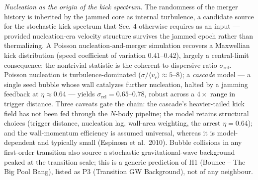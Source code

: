 \documentclass[
  11pt,
]{article}
\begin{document}
\emph{Nucleation as the origin of the kick spectrum.} The randomness of
the merger history is inherited by the jammed core as internal
turbulence, a candidate source for the stochastic kick spectrum that
Sec. 4 otherwise requires as an input --- provided nucleation-era
velocity structure survives the jammed epoch rather than thermalizing. A
Poisson nucleation-and-merger simulation recovers a Maxwellian kick
distribution (speed coefficient of variation \(0.41\)--\(0.42\)),
largely a central-limit consequence; the nontrivial statistic is the
coherent-to-dispersive ratio \(\sigma_{\text{rel}}\). Poisson nucleation
is turbulence-dominated
(\(\sigma/\langle v_r\rangle \approx 5\)--\(8\)); a \emph{cascade} model
--- a single seed bubble whose wall catalyzes further nucleation, halted
by a jamming feedback at \(\eta \approx 0.64\) --- yields
\(\sigma_{\text{rel}} = 0.65\)--\(0.78\), robust across a \(4\times\)
range in trigger distance. Three caveats gate the chain: the cascade's
heavier-tailed kick field has not been fed through the \(N\)-body
pipeline; the model retains structural choices (trigger distance,
nucleation lag, wall-area weighting, the arrest \(\eta = 0.64\)); and
the wall-momentum efficiency is assumed universal, whereas it is
model-dependent and typically small (Espinosa et al.~2010). Bubble
collisions in any first-order transition also source a stochastic
gravitational-wave background peaked at the transition scale; this is a
generic prediction of H1 (Bounce -- The Big Pool Bang), listed as P3
(Transition GW Background), not of any neighbour.
\end{document}
